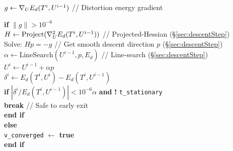 \begin{algorithm}[h!]
\hspace{20pt}  $g \leftarrow \nabla_{\small{U}} E_{d}(T^i,U^{i-1})$ \hspace{10pt}//  Distortion energy gradient 

\hspace{20pt}\textbf{if} $\|g\| > 10^{-6}$ \hspace{2pt} \\

\hspace{30pt} $H \leftarrow \text{Project}(\nabla_{\small{U}}^2 E_d(T^i,U^{i-1}))$ \hspace{10pt}// Projected-Hessian (\S\ref{sec:descentStep}) \\

\hspace{30pt} Solve: $H p = -g$ \hspace{10pt} // Get smooth descent direction $p$ (\S\ref{sec:descentStep}) \\

\hspace{30pt} $\alpha \leftarrow \text{LineSearch}(U^{i-1}, p, E_d)$ \hspace{10pt} // Line-search (\S\ref{sec:descentStep}) \\

\hspace{30pt} $U^{i} \leftarrow U^{i-1} + \alpha p$  \\
		
\hspace{30pt} $\delta^{i} \leftarrow E_{d}(T^i,U^{i}) - E_{d}(T^i,U^{i-1})$  \\

\hspace{30pt}\textbf{if} $|\delta^{i}/E_{d}(T^i,U^{i-1})| < 10^{-6}\alpha$ \textbf{and} \textbf{!}  \texttt{t\_stationary} \\
\hspace{40pt} \textbf{break} \hspace{10pt} // Safe to early exit \\
\hspace{30pt} \textbf{end if} \\

\hspace{20pt} \textbf{else}  \\
\hspace{30pt} \texttt{v\_converged} $\leftarrow $ \textbf{true} \\
\hspace{20pt} \textbf{end if} \\


\end{algorithm}
